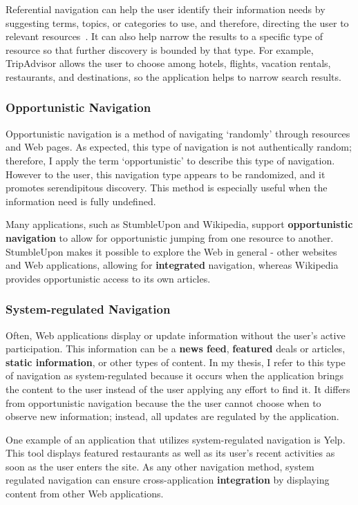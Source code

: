 {{{Referential navigation can help the user identify their information needs by suggesting terms, topics, or categories to use, and therefore, directing the user to relevant resources~\cite{levene2011introduction}. It can also help narrow the results to a specific type of resource so that further discovery is bounded by that type. For example, TripAdvisor allows the user to choose among hotels, flights, vacation rentals, restaurants, and destinations, so the application helps to narrow search results.

} %

{\subsubsection{Opportunistic Navigation}
Opportunistic navigation is a method of navigating `randomly' through resources and Web pages.  As expected, this type of navigation is not authentically random; therefore, I apply the term `opportunistic' to describe this type of navigation. However to the user, this navigation type appears to be randomized, and it promotes serendipitous discovery. This method is especially useful when the information need is fully undefined.

Many applications, such as StumbleUpon and Wikipedia, support \textbf{opportunistic navigation} to allow for opportunistic jumping from one resource to another. StumbleUpon makes it possible to explore the Web in general - other websites and Web applications, allowing for \textbf{integrated} navigation, whereas Wikipedia provides opportunistic access to its own articles. 
} %

{\subsubsection{System-regulated Navigation}
Often, Web applications display or update information without the user's active participation. This information can be a \textbf{news feed}, \textbf{featured} deals or articles, \textbf{static information}, or other types of content. In my thesis, I refer to this type of navigation as system-regulated because it occurs when the application brings the content to the user instead of the user applying any effort to find it. It differs from opportunistic navigation because the the user cannot choose when to observe new information; instead, all updates are regulated by the application. 

One example of an application that utilizes system-regulated navigation is Yelp. This tool displays featured restaurants as well as its user's recent activities as soon as the user enters the site. As any other navigation method, system regulated navigation can ensure cross-application \textbf{integration} by displaying content from other Web applications. 
} %
} %

}
